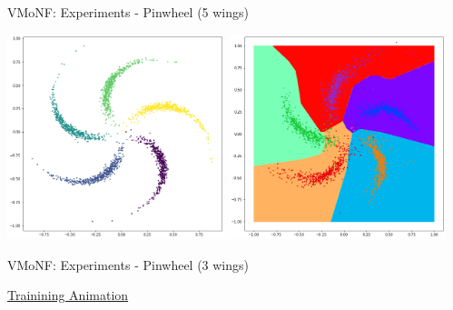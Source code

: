 \documentclass[12pt,ignorenonframetext,]{beamer}
\begin{document}
\begin{frame}{VMoNF: Experiments - Pinwheel (5 wings)}
\protect\hypertarget{vmonf-experiments---pinwheel-5-wings}{}

\centering

\includegraphics[width=0.475\textwidth]{figures/original_pinwheel.png}
\hfill
\includegraphics[width=0.475\textwidth]{figures/trained_pinwheel.png}

\end{frame}

\begin{frame}{VMoNF: Experiments - Pinwheel (3 wings)}
\protect\hypertarget{vmonf-experiments---pinwheel-3-wings}{}

\href{run:/home/colobas/dev/thesis/presentation/figures/animation/pinwheel.gif}{Trainining Animation}

\end{frame}
\end{document}
